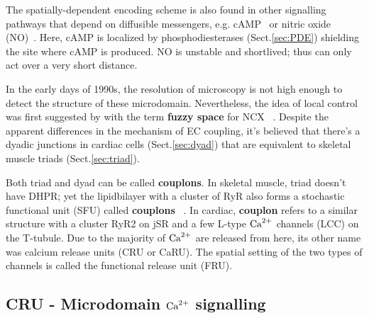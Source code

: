 
\begin{framed}
  The spatially-dependent encoding scheme is also found in other
  signalling pathways that depend on diffusible messengers,
  e.g. cAMP~\citep{fischmeister2006} or nitric oxide
  (NO)~\citep{garthwaite2005}.  Here, cAMP is localized by
  phosphodiesterases (Sect.\ref{sec:PDE}) shielding the site where cAMP is
  produced.  NO is unstable and shortlived; thus can only act over a very short
  distance.
\end{framed}

In the early days of 1990s, the resolution of microscopy is not high enough to
detect the structure of these microdomain. Nevertheless, the idea of local
control was first suggested by \citep{lederer1990, niggli1990} with the term
{\bf fuzzy space} for NCX ~\citep{lederer1990}. Despite the apparent differences
in the mechanism of EC coupling, it's believed that there's a dyadic junctions
in cardiac cells (Sect.\ref{sec:dyad}) that are equivalent to skeletal muscle
triads (Sect.\ref{sec:triad}).

Both triad and dyad can be called {\bf couplons}. In skeletal muscle, triad
doesn't have DHPR; yet the lipidbilayer with a cluster of RyR also forms a
stochastic functional unit (SFU) called {\bf couplons} ~\citep{stern1997}. In
cardiac, {\bf couplon} refers to a similar structure with a cluster RyR2 on jSR
and a few L-type ${\text{Ca}^{2+}}$ channels (LCC) on the T-tubule\citep{carl1995,
franzini_armstrong1999ssd}. Due to the majority of ${\text{Ca}^{2+}}$ are released from here,
its other name was calcium release units (CRU or CaRU). The spatial setting of
the two types of channels is called the functional release unit (FRU).

\subsection{CRU - Microdomain ${\text{Ca}^{2+}}$ signalling}
\label{sec:cru_calcium_release_unit}





